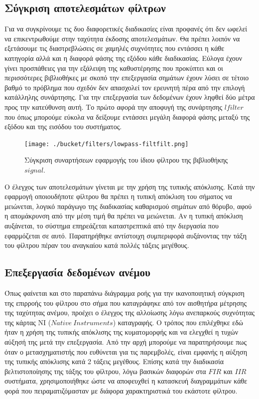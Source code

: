 \documentclass[breaklines=true, 12pt]{article}
\begin{document}
\subsection{Σύγκριση αποτελεσμάτων φίλτρων}
\label{sec:org6058c52}
Για να συγκρίνουμε τις δυο διαφορετικές διαδικασίες είναι προφανές ότι δεν
ωφελεί να επικεντρωθούμε στην ταχύτητα έκδοσης αποτελεσμάτων. Θα πρέπει λοιπόν
να εξετάσουμε τις διαστρεβλώσεις σε χαμηλές συχνότητες που εντάσσει η κάθε
κατηγορία αλλά και η διαφορά φάσης της εξόδου κάθε διαδικασίας. Εύλογα έχουν
γίνει προσπάθειες για την εξάλειψη της καθυστέρησης που προκύπτει και οι
περισσότερες βιβλιοθήκες με σκοπό την επεξεργασία σημάτων έχουν λύσει σε
τέτοιο βαθμό το πρόβλημα που σχεδόν δεν απασχολεί τον ερευνητή πέρα από την
επιλογή κατάλληλης συνάρτησης. Για την επεξεργασία των δεδομένων έχουν ληφθεί
δύο μέτρα προς την κατεύθυνση αυτή. Το πρώτο αφορά την αποφυγή της συνάρτησης
\(lfilter\) που όπως μπορούμε εύκολα να δείξουμε εντάσσει μεγάλη διαφορά φάσης μεταξύ
της εξόδου και της εισόδου του συστήματος.

\begin{figure}[htbp]
\centering
\texttt{[image: ./bucket/filters/lowpass-filtfilt.png]}
\caption{Σύγκριση συναρτήσεων εφαρμογής του ίδιου φίλτρου της βιβλιοθήκης \(signal\).}
\end{figure}

Ο έλεγχος των αποτελεσμάτων γίνεται με την χρήση της τυπικής απόκλισης. Κατά
την εφαρμογή οποιουδήποτε φίλτρου θα πρέπει η τυπική απόκλιση του σήματος να
μειώνεται, λογικό παράγωγο της διαδικασίας καθαρισμού σημάτων από θόρυβο, αφού
η απομάκρυνση από την μέση τιμή θα πρέπει να μειώνεται. Αν η τυπική απόκλιση
αυξάνεται, το σύστημα επηρεάζεται καταστρεπτικά από την διεργασία που
εφαρμόζεται σε αυτό. Παρατηρήθηκε αντίστοιχη συμπεριφορά αυξάνοντας την τάξη
του φίλτρου πέραν του αναγκαίου κατά πολλές τάξεις μεγέθους.

\subsection{Επεξεργασία δεδομένων ανέμου}
\label{sec:org0b7831c}
Όπως φαίνεται και στο παραπάνω διάγραμμα ροής για την ικανοποιητική σύγκριση
της επιρροής του φίλτρου στο σήμα που καταγράφηκε από τον αισθητήρα μέτρησης
της ταχύτητας ανέμου, προέχει ο έλεγχος της αλλοίωσης λόγω ανεπαρκούς
συχνότητας της κάρτας ΝΙ (\(Native\ Instruments\)) καταγραφής. Ο τρόπος που επιλέχθηκε
εδώ ήταν η χρήση της τυπικής απόκλισης της κυματομορφής και να ελεγχθεί η
τυχών αύξησή της μετά την επεξεργασία. Από την αρχή μπορούμε να
παρατηρήσουμε πως όταν ο μετασχηματιστής που ευθύνεται για τις παρεμβολές,
είναι εμφανής η αύξηση της τυπικής απόκλισης κατά 2 τάξεις μεγέθους. Επίσης
κατά την διαδικασία βελτιστοποίησης της τάξης του φίλτρου, λόγω βασικών
διαφορών στα \(FIR\) και \(IIR\) συστήματα, χρησιμοποιήθηκε ώστε να αποφευχθεί η
κατασκευή διαγραμμάτων κάθε φορά που πειραματιζόμασταν με διάφορα
χαρακτηριστικά του εκάστοτε φίλτρου.
\end{document}
